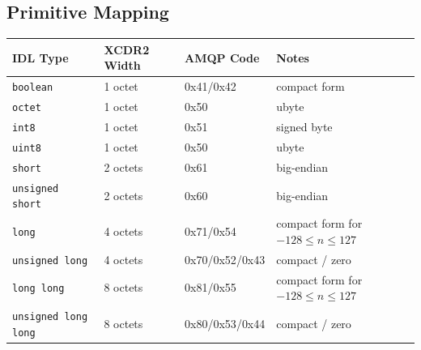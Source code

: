 \documentclass{../styles/zerodds-vendor-spec}
\begin{document}
\subsection{Primitive Mapping}

\begin{longtable}{p{3.0cm}p{1.8cm}p{3.6cm}p{3.2cm}}
  \toprule
  \textbf{IDL Type} & \textbf{XCDR2 Width} & \textbf{AMQP Code} & \textbf{Notes} \\
  \midrule
  \endhead
  \texttt{boolean}              & 1 octet       & \textsf{0x41}\enspace/\enspace\textsf{0x42}                                       & compact form \\
  \texttt{octet}                & 1 octet       & \textsf{0x50}                                                                    & ubyte \\
  \texttt{int8}                 & 1 octet       & \textsf{0x51}                                                                    & signed byte \\
  \texttt{uint8}                & 1 octet       & \textsf{0x50}                                                                    & ubyte \\
  \texttt{short}                & 2 octets      & \textsf{0x61}                                                                    & big-endian \\
  \texttt{unsigned short}       & 2 octets      & \textsf{0x60}                                                                    & big-endian \\
  \texttt{long}                 & 4 octets      & \textsf{0x71}\enspace/\enspace\textsf{0x54}                                       & compact form for $-128 \le n \le 127$ \\
  \texttt{unsigned long}        & 4 octets      & \textsf{0x70}\enspace/\enspace\textsf{0x52}\enspace/\enspace\textsf{0x43}            & compact / zero \\
  \texttt{long long}            & 8 octets      & \textsf{0x81}\enspace/\enspace\textsf{0x55}                                       & compact form for $-128 \le n \le 127$ \\
  \texttt{unsigned long long}   & 8 octets      & \textsf{0x80}\enspace/\enspace\textsf{0x53}\enspace/\enspace\textsf{0x44}            & compact / zero \\

\end{longtable}
\end{document}
